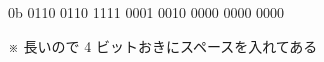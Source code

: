 \begin{center}
0b 0110 0110 1111 0001 0010 0000 0000 0000

\noindent ※ 長いので 4 ビットおきにスペースを入れてある
\end{center}
